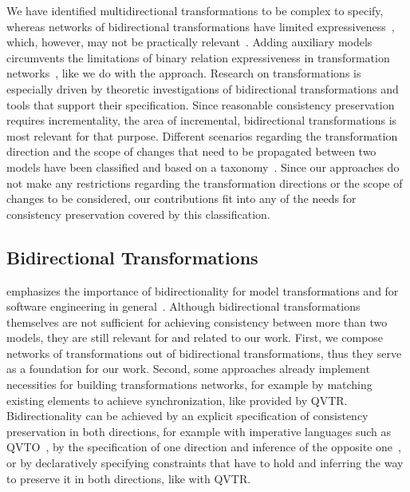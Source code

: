 We have identified multidirectional transformations to be complex to specify, whereas networks of bidirectional transformations have limited expressiveness~\cite{stevens2020BidirectionalTransformationLarge-SoSym}, which, however, may not be practically relevant~\cite{cleve2019dagstuhl}.
Adding auxiliary models circumvents the limitations of binary relation expressiveness in transformation networks~\cite{stevens2020BidirectionalTransformationLarge-SoSym}, like we do with the \commonalities approach.
Research on transformations is especially driven by theoretic investigations of bidirectional transformations and tools that support their specification.
Since reasonable consistency preservation requires incrementality, the area of incremental, bidirectional transformations is most relevant for that purpose.
Different scenarios regarding the transformation direction and the scope of changes that need to be propagated between two models have been classified and based on a taxonomy~\cite{diskin2016Taxonomy-JSS}.
Since our approaches do not make any restrictions regarding the transformation directions or the scope of changes to be considered, our contributions fit into any of the needs for consistency preservation covered by this classification.


\subsection{Bidirectional Transformations}

 emphasizes the importance of bidirectionality for model transformations and for software engineering in general~\cite{stevens2018bidirectionality-ECMFA}.
Although bidirectional transformations themselves are not sufficient for achieving consistency between more than two models, they are still relevant for and related to our work.
First, we compose networks of transformations out of bidirectional transformations, thus they serve as a foundation for our work.
Second, some approaches already implement necessities for building transformations networks, for example by matching existing elements to achieve synchronization, like provided by \gls{QVTR}.
Bidirectionality can be achieved by an explicit specification of consistency preservation in both directions, for example with imperative languages such as \gls{QVTO}~\cite{qvt}, by the specification of one direction and inference of the opposite one~\cite{xiong2007backwardTransformation-ASE, hettel2008synchronization-ICMT, semerath2016backwardTransformation-MODELS}, or by declaratively specifying constraints that have to hold and inferring the way to preserve it in both directions, like with \gls{QVTR}.

